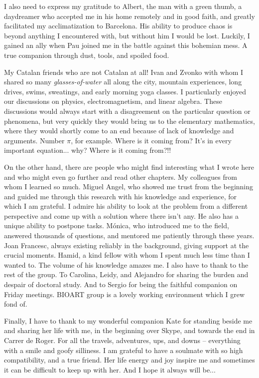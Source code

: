 \begin{acknowledgements}
I also need to express my gratitude to Albert, the man with a green thumb, a daydreamer who accepted me in his home remotely and in good faith, and greatly facilitated my acclimatization to Barcelona. His ability to produce chaos is beyond anything I encountered with, but without him I would be lost. Luckily, I gained an ally when Pau joined me in the battle against this bohemian mess. A true companion through dust, tools, and spoiled food.

My Catalan friends who are not Catalan at all! Ivan and Zvonko with whom I shared so many \emph{glasses-of-water} all along the city, mountain experiences, long drives, swims, sweatings, and early morning yoga classes. I particularly enjoyed our discussions on physics, electromagnetism, and linear algebra. These discussions would always start with a disagreement on the particular question or phenomena, but very quickly they would bring us to the elementary mathematics, where they would shortly come to an end because of lack of knowledge and arguments. Number $\pi$, for example. Where is it coming from? It's in every important equation... why? Where is it coming from?!!

On the other hand, there are people who might find interesting what I wrote here and who might even go further and read other chapters. My colleagues from whom I learned so much. Miguel Angel, who showed me trust from the beginning and guided me through this research with his knowledge and experience, for which I am grateful. I admire his ability to look at the problem from a different perspective and come up with a solution where there isn't any. He also has a unique ability to postpone tasks. Mónica, who introduced me to the field, answered thousands of questions, and mentored me patiently through these years. Joan Francesc, always existing reliably in the background, giving support at the crucial moments. Hamid, a kind fellow with whom I spent much less time than I wanted to. The volume of his knowledge amazes me. I also have to thank to the rest of the group. To Carolina, Leidy, and Alejandro for sharing the burden and despair of doctoral study. And to Sergio for being the faithful companion on Friday meetings. BIOART group is a lovely working environment which I grew fond of.

Finally, I have to thank to my wonderful companion Kate for standing beside me and sharing her life with me, in the beginning over Skype, and towards the end in Carrer de Roger. For all the travels, adventures, ups, and downs -- everything with a smile and goofy silliness. I am grateful to have a soulmate with so high compatibility, and a true friend. Her life energy and joy inspire me and sometimes it can be difficult to keep up with her. And I hope it always will be...


\end{acknowledgements}
